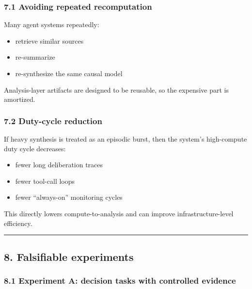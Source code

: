 \documentclass[11pt]{article}
\providecommand{\tightlist}{%
  \setlength{\itemsep}{0pt}\setlength{\parskip}{0pt}}
\begin{document}
\hypertarget{avoiding-repeated-recomputation}{%
\subsubsection{7.1 Avoiding repeated
recomputation}\label{avoiding-repeated-recomputation}}

Many agent systems repeatedly:

\begin{itemize}
\tightlist
\item
  retrieve similar sources
\item
  re-summarize
\item
  re-synthesize the same causal model
\end{itemize}

Analysis-layer artifacts are designed to be reusable, so the expensive
part is amortized.

\hypertarget{duty-cycle-reduction}{%
\subsubsection{7.2 Duty-cycle reduction}\label{duty-cycle-reduction}}

If heavy synthesis is treated as an episodic burst, then the system's
high-compute duty cycle decreases:

\begin{itemize}
\tightlist
\item
  fewer long deliberation traces
\item
  fewer tool-call loops
\item
  fewer ``always-on'' monitoring cycles
\end{itemize}

This directly lowers compute-to-analysis and can improve
infrastructure-level efficiency.

\begin{center}\rule{0.5\linewidth}{0.5pt}\end{center}

\hypertarget{falsifiable-experiments}{%
\subsection{8. Falsifiable experiments}\label{falsifiable-experiments}}

\hypertarget{experiment-a-decision-tasks-with-controlled-evidence}{%
\subsubsection{8.1 Experiment A: decision tasks with controlled
evidence}\label{experiment-a-decision-tasks-with-controlled-evidence}}
\end{document}
